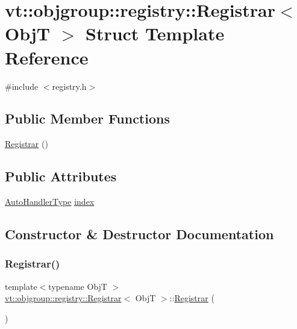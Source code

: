 \hypertarget{structvt_1_1objgroup_1_1registry_1_1_registrar}{}\section{vt\+:\+:objgroup\+:\+:registry\+:\+:Registrar$<$ ObjT $>$ Struct Template Reference}
\label{structvt_1_1objgroup_1_1registry_1_1_registrar}


{\ttfamily \#include $<$registry.\+h$>$}

\subsection*{Public Member Functions}
\begin{DoxyCompactItemize}
\item 
\hyperlink{structvt_1_1objgroup_1_1registry_1_1_registrar_a8936d193977a142440b6e8af1d884e39}{Registrar} ()
\end{DoxyCompactItemize}
\subsection*{Public Attributes}
\begin{DoxyCompactItemize}
\item 
\hyperlink{namespacevt_1_1objgroup_1_1registry_ab61bb18a54c83c090d49a1a7f6f30037}{Auto\+Handler\+Type} \hyperlink{structvt_1_1objgroup_1_1registry_1_1_registrar_abd3c1a64c0c977d13878cfd389f73f0c}{index}
\end{DoxyCompactItemize}


\subsection{Constructor \& Destructor Documentation}
\mbox{\label{structvt_1_1objgroup_1_1registry_1_1_registrar_a8936d193977a142440b6e8af1d884e39}} 
\subsubsection{\texorpdfstring{Registrar()}{Registrar()}}
{\footnotesize\ttfamily template$<$typename ObjT $>$ \\
\hyperlink{structvt_1_1objgroup_1_1registry_1_1_registrar}{vt\+::objgroup\+::registry\+::\+Registrar}$<$ ObjT $>$\+::\hyperlink{structvt_1_1objgroup_1_1registry_1_1_registrar}{Registrar} (\begin{DoxyParamCaption}{ }\end{DoxyParamCaption})}



